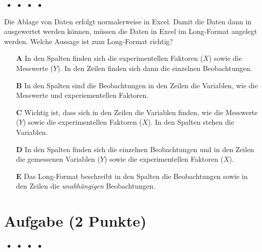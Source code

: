 \documentclass[a4paper, 9pt]{scrartcl}\usepackage[]{graphicx}\usepackage[]{xcolor}
\begin{document}
\ifcollection
\begin{flushright}
\tiny\vspace{-2Ex}
\textbf{\examinhaltstart}
\exammodulemathstat $\;\bullet$
\exammodulestat $\;\bullet$
\exammodulestatbbv $\;\bullet$
\exammodulestatversuch $\;\bullet$
\exammodulebiostat
\vspace{-1Ex}
\end{flushright}
\fi




Die Ablage von Daten erfolgt normalerweise in Excel. Damit die Daten dann in \Rlogo ausgewertet werden können, müssen die Daten in Excel im Long-Format angelegt werden. Welche Aussage ist zum Long-Format richtig?



\begin{enumerate}
\item [\textbf{A} \msquare] In den Spalten finden sich die experimentellen Faktoren ($X$) sowie die Messwerte ($Y$). In den Zeilen finden sich dann die einzelnen Beobachtungen.
\item [\textbf{B} \msquare] In den Spalten sind die Beobachtungen in den Zeilen die Variablen, wie die Messwerte und experiementellen Faktoren.
\item [\textbf{C} \msquare] Wichtig ist, dass sich in den Zeilen die Variablen finden, wie die Messwerte ($Y$) sowie die experimentellen Faktoren ($X$). In den Spalten stehen die Variablen.
\item [\textbf{D} \msquare] In den Spalten finden sich die einzelnen Beobachtungen und in den Zeilen die gemessenen Variablen ($Y$) sowie die experimentellen Faktoren ($X$).
\item [\textbf{E} \msquare] Das Long-Format beschreibt in den Spalten die Beobachtungen sowie in den Zeilen die \textit{unabhängigen} Beobachtungen.
\end{enumerate} 

\section{Aufgabe \hfill (2 Punkte)}

\ifcollection
\begin{flushright}
\tiny\vspace{-2Ex}
\textbf{\examinhaltstart}
\exammodulemathstat $\;\bullet$
\exammodulestat $\;\bullet$
\exammodulestatbbv $\;\bullet$
\exammodulestatversuch $\;\bullet$
\exammodulebiostat
\vspace{-1Ex}
\end{flushright}
\fi
\end{document}
